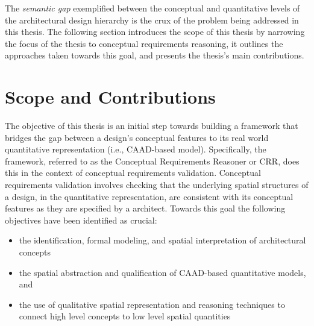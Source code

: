 \documentclass[12pt]{ucthesis}
\begin{document}
The \emph{semantic gap} exemplified between the conceptual and quantitative levels of the architectural design hierarchy is the crux of the problem being addressed in this thesis. The following section introduces the scope of this thesis by narrowing the focus of the thesis to conceptual requirements reasoning, it outlines the approaches taken towards this goal, and presents the thesis's main contributions. 






\section{Scope and Contributions}
The objective of this thesis is an initial step towards building a framework that bridges the gap between a design's conceptual features to its real world quantitative representation (i.e., CAAD-based model). Specifically, the framework, referred to as the Conceptual Requirements Reasoner or CRR, does this in the context of conceptual requirements validation. Conceptual requirements validation involves checking that the underlying spatial structures of a design, in the quantitative representation, are consistent with its conceptual features as they are specified by a architect. Towards this goal the following objectives have been identified as crucial:
\begin{itemize}
\item the identification, formal modeling, and spatial interpretation of architectural concepts
\item the spatial abstraction and qualification of CAAD-based quantitative models, and
\item the use of qualitative spatial representation and reasoning techniques to connect high level concepts to low level spatial quantities  
\end{itemize}
\end{document}
